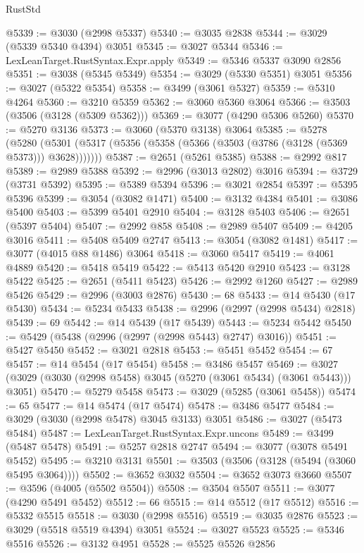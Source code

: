 \begin{lexlean}{RustStd}
\begin{coremodule}
@5339 := @3030 (@2998 @5337)
@5340 := @3035 @2838
@5344 := @3029 (@5339 @5340 @4394) @3051
@5345 := @3027 @5344
@5346 := LexLeanTarget.RustSyntax.Expr.apply
@5349 := @5346 @5337 @3090 @2856
@5351 := @3038 (@5345 @5349)
@5354 := @3029 (@5330 @5351) @3051
@5356 := @3027 (@5322 @5354)
@5358 := @3499 (@3061 @5327)
@5359 := @5310 @4264
@5360 := @3210 @5359
@5362 := @3060 @5360 @3064
@5366 := @3503 (@3506 (@3128 (@5309 @5362)))
@5369 := @3077 (@4290 @5306 @5260)
@5370 := @5270 @3136
@5373 := @3060 (@5370 @3138) @3064
@5385 := @5278
    (@5280 (@5301 (@5317 (@5356 (@5358 (@5366 (@3503 (@3786 (@3128 (@5369 @5373))) @3628)))))))
@5387 := @2651 (@5261 @5385)
@5388 := @2992 @817
@5389 := @2989 @5388
@5392 := @2996 (@3013 @2802) @3016
@5394 := @3729 (@3731 @5392)
@5395 := @5389 @5394
@5396 := @3021 @2854
@5397 := @5395 @5396
@5399 := @3054 (@3082 @1471)
@5400 := @3132 @4384
@5401 := @3086 @5400
@5403 := @5399 @5401 @2910
@5404 := @3128 @5403
@5406 := @2651 (@5397 @5404)
@5407 := @2992 @858
@5408 := @2989 @5407
@5409 := @4205 @3016
@5411 := @5408 @5409 @2747
@5413 := @3054 (@3082 @1481)
@5417 := @3077 (@4015 @88 @1486) @3064
@5418 := @3060 @5417
@5419 := @4061 @4889
@5420 := @5418 @5419
@5422 := @5413 @5420 @2910
@5423 := @3128 @5422
@5425 := @2651 (@5411 @5423)
@5426 := @2992 @1260
@5427 := @2989 @5426
@5429 := @2996 (@3003 @2876)
@5430 := 68
@5433 := @14 @5430 (@17 @5430)
@5434 := @5234 @5433
@5438 := @2996 (@2997 (@2998 @5434) @2818)
@5439 := 69
@5442 := @14 @5439 (@17 @5439)
@5443 := @5234 @5442
@5450 := @5429 (@5438 (@2996 (@2997 (@2998 @5443) @2747) @3016))
@5451 := @5427 @5450
@5452 := @3021 @2818
@5453 := @5451 @5452
@5454 := 67
@5457 := @14 @5454 (@17 @5454)
@5458 := @3486 @5457
@5469 := @3027 (@3029 (@3030 (@2998 @5458) @3045 (@5270 (@3061 @5434) (@3061 @5443))) @3051)
@5470 := @5279 @5458
@5473 := @3029 (@5285 (@3061 @5458))
@5474 := 65
@5477 := @14 @5474 (@17 @5474)
@5478 := @3486 @5477
@5484 := @3029 (@3030 (@2998 @5478) @3045 @3133) @3051
@5486 := @3027 (@5473 @5484)
@5487 := LexLeanTarget.RustSyntax.Expr.uncons
@5489 := @3499 (@5487 @5478)
@5491 := @5257 @2818 @2747
@5494 := @3077 (@3078 @5491 @5452)
@5495 := @3210 @3131
@5501 := @3503 (@3506 (@3128 (@5494 (@3060 @5495 @3064))))
@5502 := @3652 @3032
@5504 := @3652 @3073 @3660
@5507 := @3596 (@4005 (@5502 @5504))
@5508 := @3504 @5507
@5511 := @3077 (@4290 @5491 @5452)
@5512 := 66
@5515 := @14 @5512 (@17 @5512)
@5516 := @5332 @5515
@5518 := @3030 (@2998 @5516)
@5519 := @3035 @2876
@5523 := @3029 (@5518 @5519 @4394) @3051
@5524 := @3027 @5523
@5525 := @5346 @5516
@5526 := @3132 @4951
@5528 := @5525 @5526 @2856

\end{coremodule}
\end{lexlean}

